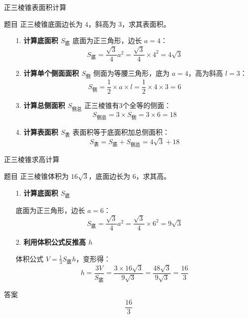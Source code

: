   \begin{frame}{正三棱锥表面积计算}
    \begin{block}{题目}
      正三棱锥底面边长为 \(4\)，斜高为 \(3\)，求其表面积。
    \end{block}
    \pause
  
    \begin{enumerate}
      \item[1.] \textbf{计算底面积 \(S_{\text{底}}\)}  
        底面为正三角形，边长 \(a = 4\)：  
        \[
        S_{\text{底}} = \frac{\sqrt{3}}{4}a^2 = \frac{\sqrt{3}}{4} \times 4^2 = 4\sqrt{3}
        \]
  
      \item[2.] \textbf{计算单个侧面面积 \(S_{\text{侧}}\)}  
        侧面为等腰三角形，底为 \(a = 4\)，高为斜高 \(l = 3\)：  
        \[
        S_{\text{侧}} = \frac{1}{2} \times a \times l = \frac{1}{2} \times 4 \times 3 = 6
        \]
  
      \item[3.] \textbf{计算总侧面积 \(S_{\text{侧总}}\)}  
        正三棱锥有3个全等的侧面：  
        \[
        S_{\text{侧总}} = 3 \times S_{\text{侧}} = 3 \times 6 = 18
        \]
  
      \item[4.] \textbf{计算表面积 \(S_{\text{表}}\)}  
        表面积等于底面积加总侧面积：  
        \[
        S_{\text{表}} = S_{\text{底}} + S_{\text{侧总}} = 4\sqrt{3} + 18
        \]
    \end{enumerate}

  \end{frame}
  


  \begin{frame}{正三棱锥求高计算}
    \begin{block}{题目}
      正三棱锥体积为 \(16\sqrt{3}\)，底面边长为 \(6\)，求其高。
    \end{block}
    \pause
    \begin{enumerate}
      \item[1.] \textbf{计算底面积 \(S_{\text{底}}\)}  

        底面为正三角形，边长 \(a = 6\)：  
        \[
        S_{\text{底}} = \frac{\sqrt{3}}{4}a^2 = \frac{\sqrt{3}}{4} \times 6^2 = 9\sqrt{3}
        \]
  
      \item[2.] \textbf{利用体积公式反推高 \(h\)}  
      
        体积公式 \(V = \frac{1}{3}S_{\text{底}}h\)，变形得：  
        \[
        h = \frac{3V}{S_{\text{底}}} = \frac{3 \times 16\sqrt{3}}{9\sqrt{3}} = \frac{48\sqrt{3}}{9\sqrt{3}} = \frac{16}{3}
        \]
    \end{enumerate}
  
    \begin{exampleblock}{答案}
      \[
      \boxed{\dfrac{16}{3}}
      \]
    \end{exampleblock}
  \end{frame}
  
